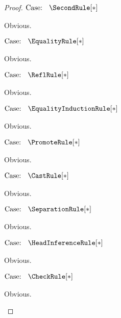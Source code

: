 \begin{proof}
$\text{Case: }\begin{array}{c} \SecondRule[*] \end{array}$
\begin{proofcase}
    Obvious.
\end{proofcase}

$\text{Case: }\begin{array}{c} \EqualityRule[*] \end{array}$
\begin{proofcase}
    Obvious.
\end{proofcase}

$\text{Case: }\begin{array}{c} \ReflRule[*] \end{array}$
\begin{proofcase}
    Obvious.
\end{proofcase}

$\text{Case: }\begin{array}{c} \EqualityInductionRule[*] \end{array}$
\begin{proofcase}
    Obvious.
\end{proofcase}

$\text{Case: }\begin{array}{c} \PromoteRule[*] \end{array}$
\begin{proofcase}
    Obvious.
\end{proofcase}

$\text{Case: }\begin{array}{c} \CastRule[*] \end{array}$
\begin{proofcase}
    Obvious.
\end{proofcase}

$\text{Case: }\begin{array}{c} \SeparationRule[*] \end{array}$
\begin{proofcase}
    Obvious.
\end{proofcase}

$\text{Case: }\begin{array}{c} \HeadInferenceRule[*] \end{array}$
\begin{proofcase}
    Obvious.
\end{proofcase}

$\text{Case: }\begin{array}{c} \CheckRule[*] \end{array}$
\begin{proofcase}
    Obvious.
\end{proofcase}


\end{proof}

